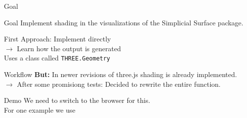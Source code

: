 \documentclass{beamer}
\numberwithin{equation}{aufgabe}
\begin{document}
\begin{frame}{Goal}
    \begin{exampleblock}{Goal}
        Implement shading in the visualizations of the Simplicial Surface package.
    \end{exampleblock}
    \pause
    First Approach: Implement directly\\
    $\xrightarrow{}$ Learn how the output is generated\\
    Uses a class called \texttt{THREE.Geometry} \\
    
\end{frame}

\begin{frame}{Workflow}
    \textbf{But:} In newer revisions of three.js shading is already implemented.\\
    $\xrightarrow{}$ After some promisiong tests: Decided to rewrite the entire function.
\end{frame}

\begin{frame}{Demo}
    We need to switch to the browser for this.\\
    For one example we use \cite{ico}
    
\end{frame}
\end{document}
